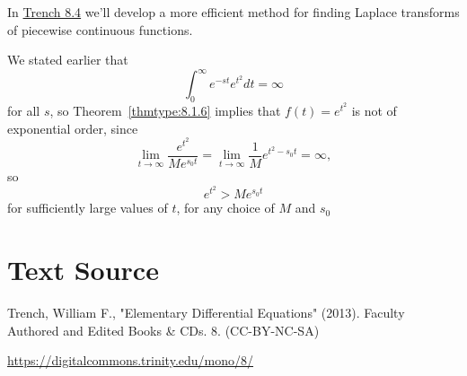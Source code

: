 \documentclass{ximera}
\begin{document}
\begin{remark}
In \href{https://ximera.osu.edu/ode/main/unitStepFunction/unitStepFunction}{Trench 8.4} 
we'll develop a more efficient
method for finding Laplace transforms of piecewise continuous functions.
\end{remark}

\begin{example}\label{example:8.1.11}
We stated  earlier that
$$
\int_0^\infty e^{-st} e^{t^2} dt=\infty
$$
for all $s$, so Theorem~\ref{thmtype:8.1.6} implies that $f(t)=e^{t^2}$
is not  of exponential order, since
$$
\lim_{t\rightarrow\infty} \frac{e^{t^2}}{Me^{s_0t}}=\lim_{t\rightarrow\infty} \frac{1}{M} e^{t^2-s_0t}=\infty,
$$
so
$$
e^{t^2}>Me^{s_0t}
$$
for sufficiently large values of $t$, for any choice of $M$ and $s_{0}$
\end{example}


\section*{Text Source}
Trench, William F., "Elementary Differential Equations" (2013). Faculty Authored and Edited Books \& CDs. 8. (CC-BY-NC-SA)

\href{https://digitalcommons.trinity.edu/mono/8/}{https://digitalcommons.trinity.edu/mono/8/}
\end{document}
